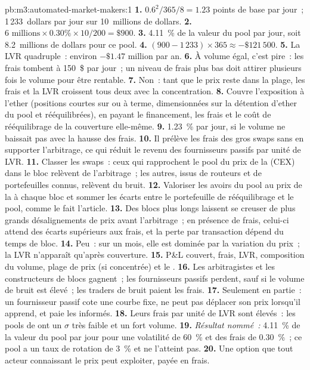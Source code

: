 \begin{solution}{pb:m3:automated-market-makers:1}
\textbf{1.} $0.6^2/365/8 = 1.23$ points de base par jour~; 1\,233~dollars par jour sur 10~millions de dollars. \textbf{2.} $6\text{ millions} \times 0.30\%
\times 10/200 = \$900$. \textbf{3.} 4.11~\% de la valeur du pool par jour, soit 8.2~millions de dollars pour ce pool. \textbf{4.} $(900 - 1\,233) \times 365
\approx -\$121\,500$. \textbf{5.} La LVR quadruple~: environ $-\$1.47$ million par an. \textbf{6.} À volume égal, c'est pire~: les frais tombent à
150~\$ par jour~; un niveau de frais plus bas doit attirer plusieurs fois le volume pour être rentable. \textbf{7.} Non~: tant que le prix reste dans la plage, les frais et la LVR
croissent tous deux avec la concentration. \textbf{8.} Couvre l'exposition à l'ether (positions courtes sur  ou à terme, dimensionnées sur la détention d'ether du pool et
rééquilibrées), en payant le financement, les frais et le coût de rééquilibrage de la couverture elle-même. \textbf{9.} 1.23~\% par jour, si le volume ne baissait pas avec la
hausse des frais. \textbf{10.} Il prélève les frais des gros swaps sans en supporter l'arbitrage, ce qui réduit le revenu des fournisseurs passifs par unité de
LVR. \textbf{11.} Classer les swaps~: ceux qui rapprochent le pool du prix de la  (CEX) dans le bloc relèvent de l'arbitrage~; les
autres, issus de routeurs et de portefeuilles connus, relèvent du bruit. \textbf{12.} Valoriser les avoirs du pool au prix de la  à chaque bloc et
sommer les écarts entre le portefeuille de rééquilibrage et le pool, comme le fait l'article. \textbf{13.} Des blocs plus longs laissent se creuser de plus grands désalignements
de prix avant l'arbitrage~; en présence de frais, celui-ci attend des écarts supérieurs aux frais, et la perte par transaction dépend du temps de bloc.
\textbf{14.} Peu~: sur un mois, elle est dominée par la variation du prix~; la LVR n'apparaît qu'après couverture. \textbf{15.} P\&L couvert, frais,
LVR, composition du volume, plage de prix (si concentrée) et le . \textbf{16.} Les arbitragistes et les constructeurs de blocs gagnent~; les fournisseurs passifs perdent, sauf
si le volume de bruit est élevé~; les traders de bruit paient les frais. \textbf{17.} Seulement en partie~: un fournisseur passif cote une courbe fixe, ne peut pas déplacer son prix
lorsqu'il apprend, et paie les informés. \textbf{18.} Leurs frais par unité de LVR sont élevés~: les pools de  ont un $\sigma$ très faible et un fort
volume. \textbf{19.} \emph{Résultat nommé~:} 4.11~\% de la valeur du pool par jour pour une volatilité de 60~\% et des frais de 0.30~\%~; ce pool a un taux de rotation de 3~\% et
ne l'atteint pas. \textbf{20.} Une option que tout acteur connaissant le prix peut exploiter, payée en frais.
\end{solution}

